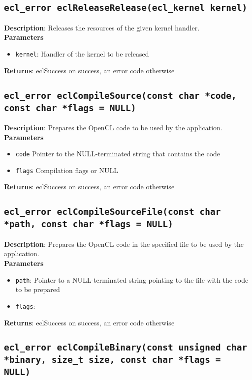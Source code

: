 \subsection{\texttt{ecl\_error eclReleaseRelease(ecl\_kernel kernel)}}

\textbf{Description}: Releases the resources of the given kernel handler. \\
\textbf{Parameters}
\begin{itemize}
  \item \texttt{kernel}: Handler of the kernel to be released
\end{itemize}
\textbf{Returns}: eclSuccess on success, an error code otherwise


\subsection{\texttt{ecl\_error eclCompileSource(const char *code, const char *flags = NULL)}}

\textbf{Description}: Prepares the OpenCL code to be used by the application. \\
\textbf{Parameters}
\begin{itemize}
  \item \texttt{code} Pointer to the NULL\hyp{}terminated string that contains the code
  \item \texttt{flags} Compilation flags or NULL
\end{itemize}
\textbf{Returns}: eclSuccess on success, an error code otherwise

\subsection{\texttt{ecl\_error eclCompileSourceFile(const char *path, const char *flags = NULL)}}

\textbf{Description}: Prepares the OpenCL code in the specified file to be used by the application.  \\
\textbf{Parameters}
\begin{itemize}
  \item \texttt{path}: Pointer to a NULL\hyp{}terminated string pointing to the file with the code 
 to be prepared
  \item \texttt{flags}: \end{itemize}
\textbf{Returns}: eclSuccess on success, an error code otherwise

\subsection{\texttt{ecl\_error eclCompileBinary(const unsigned char *binary, size\_t size, const char *flags = NULL)}}

